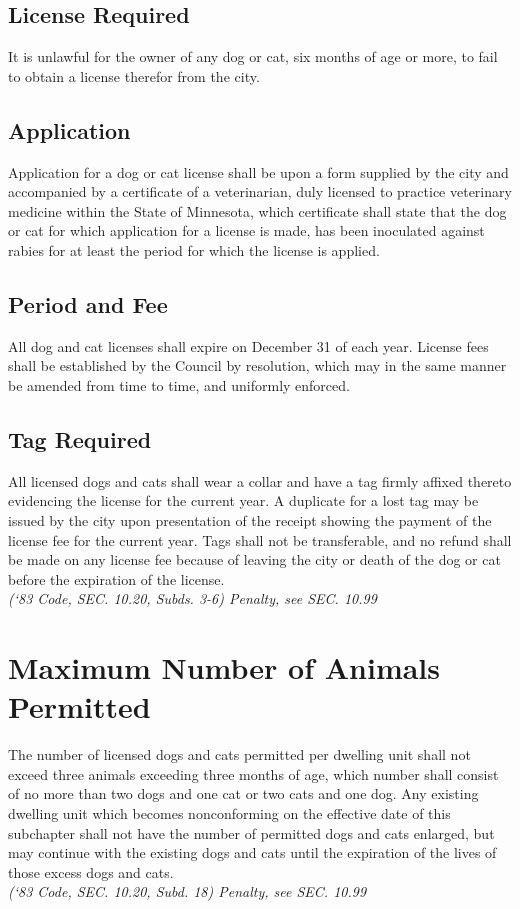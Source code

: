 \subsection{License Required}
It is unlawful for the owner of any dog or cat, six months of age or more, to fail to obtain a license therefor from the city.
\subsection{Application}
Application for a dog or cat license shall be upon a form supplied by the city and accompanied by a certificate of a veterinarian, duly licensed to practice veterinary medicine within the State of Minnesota, which certificate shall state that the dog or cat for which application for a license is made, has been inoculated against rabies for at least the period for which the license is applied.
\subsection{Period and Fee}
All dog and cat licenses shall expire on December 31 of each year.  License fees shall be established by the Council by resolution, which may in the same manner be amended from time to time, and uniformly enforced.
\subsection{Tag Required}
All licensed dogs and cats shall wear a collar and have a tag firmly affixed thereto evidencing the license for the current year.  A duplicate for a lost tag may be issued by the city upon presentation of the receipt showing the payment of the license fee for the current year.  Tags shall not be transferable, and no refund shall be made on any license fee because of leaving the city or death of the dog or cat before the expiration of the license.\\
\emph{(‘83 Code, SEC. 10.20, Subds. 3-6)  Penalty, see SEC. 10.99}

\section{Maximum Number of Animals Permitted}
The number of licensed dogs and cats permitted per dwelling unit shall not exceed three animals exceeding three months of age, which number shall consist of no more than two dogs and one cat or two cats and one dog. Any existing dwelling unit which becomes nonconforming on the effective date of this subchapter shall not have the number of permitted dogs and cats enlarged, but may continue with the existing dogs and cats until the expiration of the lives of those excess dogs and cats.\\
\emph{(‘83 Code, SEC. 10.20, Subd. 18)  Penalty, see SEC. 10.99}

